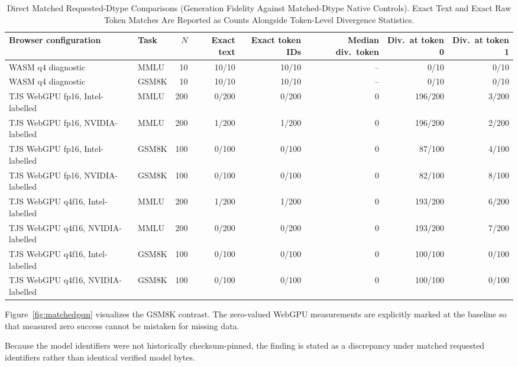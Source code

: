 \documentclass[conference]{IEEEtran}
\begin{document}
\begin{table}[t]
\caption{
Direct Matched Requested-Dtype Comparisons (Generation Fidelity Against Matched-Dtype Native Controls).
Exact Text and Exact Raw Token Matches Are Reported as Counts Alongside Token-Level Divergence Statistics.
}
\label{tab:matched_fidelity}
\centering
\footnotesize
\setlength{\tabcolsep}{6pt}
\begin{tabular}{@{}llrrrrrr@{}}
\toprule
Browser configuration & Task & $N$ & Exact text & Exact token IDs & Median div.\ token & Div.\ at token 0 & Div.\ at token 1\\
\midrule
WASM q4 diagnostic & MMLU & 10 & 10/10 & 10/10 & -- & 0/10 & 0/10\\
WASM q4 diagnostic & GSM8K & 10 & 10/10 & 10/10 & -- & 0/10 & 0/10\\
\midrule
TJS WebGPU fp16, Intel-labelled & MMLU & 200 & 0/200 & 0/200 & 0 & 196/200 & 3/200\\
TJS WebGPU fp16, NVIDIA-labelled & MMLU & 200 & 1/200 & 1/200 & 0 & 196/200 & 2/200\\
TJS WebGPU fp16, Intel-labelled & GSM8K & 100 & 0/100 & 0/100 & 0 & 87/100 & 4/100\\
TJS WebGPU fp16, NVIDIA-labelled & GSM8K & 100 & 0/100 & 0/100 & 0 & 82/100 & 8/100\\
\midrule
TJS WebGPU q4f16, Intel-labelled & MMLU & 200 & 1/200 & 1/200 & 0 & 193/200 & 6/200\\
TJS WebGPU q4f16, NVIDIA-labelled & MMLU & 200 & 0/200 & 0/200 & 0 & 193/200 & 7/200\\
TJS WebGPU q4f16, Intel-labelled & GSM8K & 100 & 0/100 & 0/100 & 0 & 100/100 & 0/100\\
TJS WebGPU q4f16, NVIDIA-labelled & GSM8K & 100 & 0/100 & 0/100 & 0 & 100/100 & 0/100\\
\bottomrule
\end{tabular}
\end{table}

Figure~\ref{fig:matchedgsm} visualizes the GSM8K contrast.
The zero-valued WebGPU measurements are explicitly marked
at the baseline so that measured zero success cannot be
mistaken for missing data.

Because the model identifiers were not historically
checksum-pinned, the finding is stated as a discrepancy
under matched requested identifiers rather than identical
verified model bytes.
\end{document}
